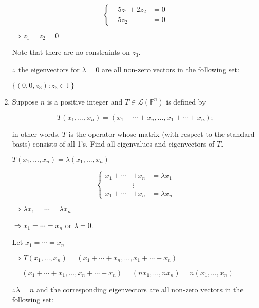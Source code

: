 \documentclass[fleqn]{article}
\makeatletter
\newenvironment{equationCenter}{\@fleqnfalse\begin{equation*}}{\end{equation*}}
\makeatother
\begin{document}
\begin{enumerate}[nolistsep]
		\begin{equation*}
			\left\{
			\begin{aligned}
				-5z_1 + 2z_2 &= 0 \\
				-5z_2 &= 0
			\end{aligned} \right.
		\end{equation*}
		
		$\Rightarrow z_1 = z_2 = 0$
		
		Note that there are no constraints on $z_3$.
		
		$\therefore$ the eigenvectors for $\lambda = 0$ are all non-zero vectors in the following set:
		
		$\{(0, 0, z_3) : z_3 \in \mathbb{F}\}$
		
		\item Suppose $n$ is a positive integer and $T \in \mathcal{L}(\mathbb{F}^n)$ is defined by
		
			\begin{equationCenter}
				T(x_1,...,x_n) = (x_1 + \cdots + x_n,..., x_1 + \cdots + x_n);
			\end{equationCenter}
			
			in other words, $T$ is the operator whose matrix (with respect to the standard basis) consists of all 1's. Find all eigenvalues and eigenvectors of $T$.
			
			$T(x_1,...,x_n) = \lambda(x_1,...,x_n)$
			
			\begin{equation*}
			\left\{
			\begin{aligned}
				x_1 + \cdots &+ x_n &= {\lambda}x_1 \\
			    &\vdots \\
				x_1 + \cdots &+ x_n &= {\lambda}x_n
			\end{aligned} \right.
		\end{equation*}
		
			$\Rightarrow {\lambda}x_1 = \cdots = {\lambda}x_n$
			
			$\Rightarrow x_1 = \cdots = x_n$ or $\lambda = 0$.
			
			Let $x_1 = \cdots = x_n$
			
			$\Rightarrow T(x_1,...,x_n) = (x_1 + \cdots + x_n, ..., x_1 + \cdots + x_n)$
			
			$ = (x_1 + \cdots + x_1, ..., x_n + \cdots + x_n) = (nx_1, ..., nx_n) = n(x_1, ..., x_n)$
			
			$\therefore \lambda = n$ and the corresponding eigenvectors are all non-zero vectors in the following set:
			

\end{enumerate}
\end{document}
